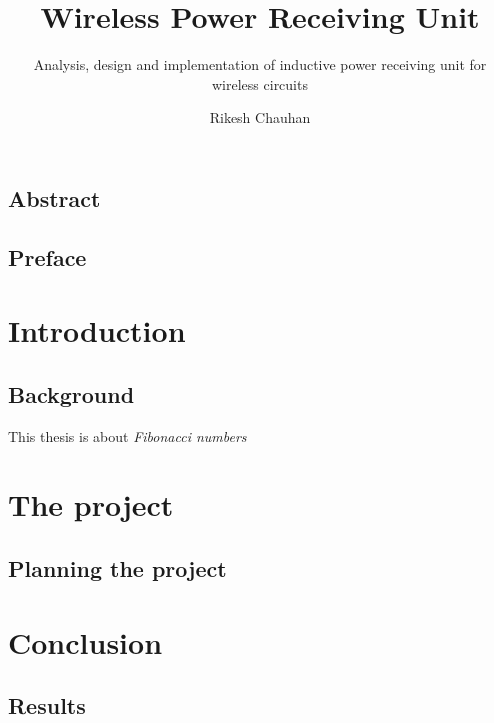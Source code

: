 \documentclass[UKenglish]{ifimaster}  %
\title{Wireless Power Receiving Unit}        %
\subtitle{Analysis, design and implementation of inductive power receiving unit for wireless circuits}         %
\author{Rikesh Chauhan}                      %
\begin{document}
\ififorside{}
\frontmatter{}
\maketitle{}

\chapter*{Abstract}                   %

\tableofcontents{}
\listoffigures{}
\listoftables{}

\chapter*{Preface}                    %

\mainmatter{}
\part{Introduction}                   %

\chapter{Background}                  %
This thesis is about                  %
\emph{Fibonacci numbers}\cite{Fib}    %

\part{The project}                    %

\chapter{Planning the project}     %

\part{Conclusion}                     %

\chapter{Results}                     %


\backmatter{}
\printbibliography
\end{document}
